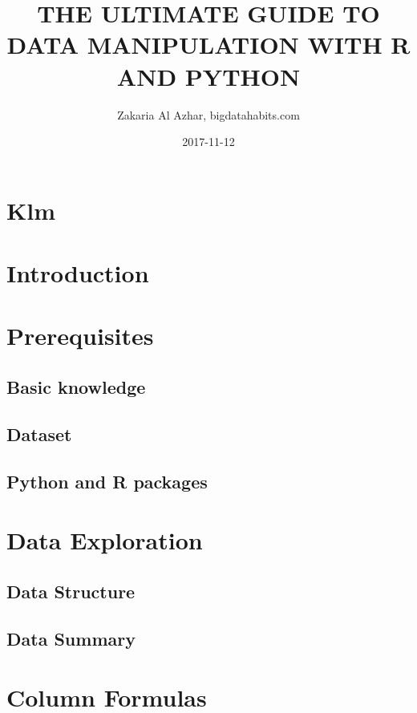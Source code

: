 \documentclass[12pt,]{book}
\title{THE ULTIMATE GUIDE TO DATA MANIPULATION WITH R AND PYTHON}
\author{Zakaria Al Azhar, bigdatahabits.com}
\date{2017-11-12}
\theoremstyle{definition}
\theoremstyle{definition}
\theoremstyle{definition}
\theoremstyle{remark}
\begin{document}
\maketitle

{
\setcounter{tocdepth}{1}
\tableofcontents
}
\chapter{Klm}\label{klm}

\chapter{Introduction}\label{intro}

\chapter{Prerequisites}\label{prerequisites}

\section{Basic knowledge}\label{basic-knowledge}

\section{Dataset}\label{dataset}

\section{Python and R packages}\label{python-and-r-packages}

\chapter{Data Exploration}\label{data-exploration}

\section{Data Structure}\label{data-structure}

\section{Data Summary}\label{data-summary}

\chapter{Column Formulas}\label{column-formulas}
\end{document}
